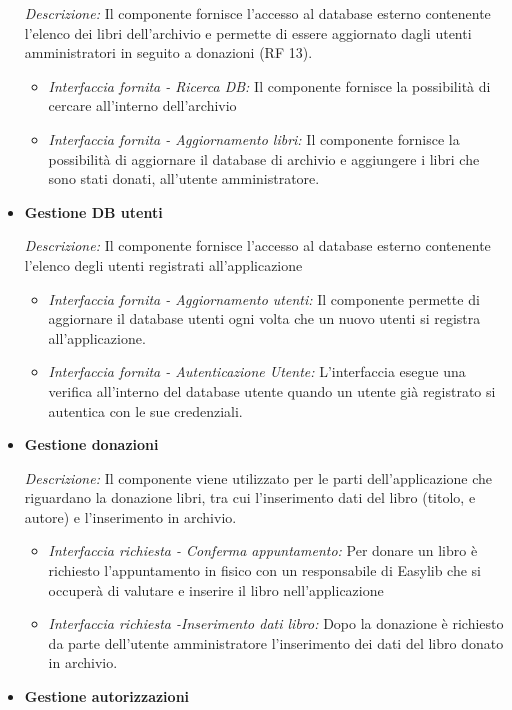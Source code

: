 \documentclass{article}
\begin{document}
\begin{itemize}
    \textit{Descrizione:} Il componente fornisce l’accesso al database esterno contenente l'elenco dei libri dell’archivio e permette di essere aggiornato dagli utenti amministratori in seguito a donazioni (RF 13).\\
    \begin{itemize}
        \item \textit{Interfaccia fornita - Ricerca DB:} Il componente fornisce la possibilità di cercare all'interno dell’archivio
        \item \textit{Interfaccia fornita - Aggiornamento libri:} Il componente fornisce la possibilità di aggiornare il database di archivio e aggiungere i libri che sono stati donati, all’utente amministratore.
    \end{itemize}
    \item \textbf{Gestione DB utenti}
    
    \textit{Descrizione:} Il componente fornisce l’accesso al database esterno contenente l'elenco degli utenti registrati all'applicazione\\
    \begin{itemize}
        \item \textit{Interfaccia fornita - Aggiornamento utenti:} Il componente permette di aggiornare il database utenti ogni volta che un nuovo utenti si registra all'applicazione.
        \item \textit{Interfaccia fornita - Autenticazione Utente:} L'interfaccia esegue una verifica all’interno del database utente quando un utente già registrato si autentica con le sue credenziali.
    \end{itemize}
    \item \textbf{Gestione donazioni}
    
    \textit{Descrizione:} Il componente viene utilizzato per le parti dell'applicazione che riguardano la donazione libri, tra cui l'inserimento dati del libro (titolo, e autore) e l'inserimento in archivio.
    
    \begin{itemize}
        \item \textit{Interfaccia richiesta - Conferma appuntamento:} Per donare un libro è richiesto l’appuntamento in fisico con un responsabile di Easylib che si occuperà di valutare e inserire il libro nell’applicazione
        \item \textit{Interfaccia richiesta -Inserimento dati libro:} Dopo la donazione è richiesto da parte dell'utente amministratore l’inserimento dei dati del libro donato in archivio.
    \end{itemize}
    \item \textbf{Gestione autorizzazioni}
    

\end{itemize}
\end{document}
